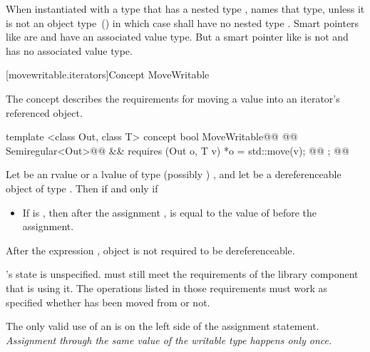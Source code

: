 \begin{addedblock}
\pnum
When instantiated with a type  that has a nested type ,
 names that type, unless it is not an object type~() in which case
 shall have no nested type . \enternote Smart pointers like
 are  and have an associated value type. But a smart pointer
like  is not  and has no associated value type.\exitnote

[movewritable.iterators]{Concept MoveWritable}

\pnum
The  concept describes the requirements for moving a value into an iterator's
referenced object.

%
\begin{codeblock}
  template <class Out, class T>
  concept bool MoveWritable@\newtxt{() \{}\oldtxt{ =}@
    @@ Semiregular<Out>@\newtxt{()}@ &&
      requires (Out o, T v) {
        *o = std::move(v); @@
      };
  @\newtxt{\}}@
\end{codeblock}

\pnum
Let  be an rvalue or a lvalue of type (possibly ) , and let 
be a dereferenceable object of type . Then    if and only if

\begin{itemize}
\item If  is ,
then after the assignment ,  is equal
to the value of  before the assignment.
\end{itemize}

\pnum
After the expression , object  is not required to be dereferenceable.

\pnum
{}'s state is unspecified. \enternote {} must still meet the
requirements of the library component that is using it. The operations listed
in those requirements must work as specified whether  has been moved
from or not.\exitnote

\pnum
\enternote
The only valid use of an  is on the left side of the assignment statement.
\textit{Assignment through the same value of the writable type happens only once.}
\exitnote


\end{addedblock}
